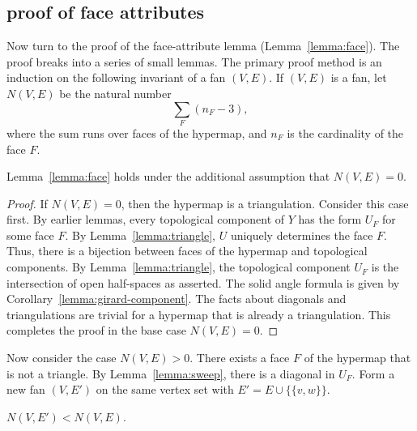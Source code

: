 \subsection{proof of face attributes}

Now turn to the proof of the face-attribute lemma (Lemma~\ref{lemma:face}).  The proof breaks into a series of small lemmas.  The primary proof method is an induction on the following invariant of a fan $(V,E)$.  If $(V,E)$ is a fan,  let $N(V,E)$ be the natural number
$$
\sum_F (n_F - 3),
$$
where the sum runs over faces of the  hypermap, and $n_F$ is the cardinality of the face $F$.

\begin{lemma} Lemma~\ref{lemma:face} holds under the additional assumption that $N(V,E) = 0$.
\end{lemma}

\begin{proof}
If $N(V,E)=0$, then the hypermap is a triangulation.  Consider this
case first.  By earlier lemmas, every topological component of $Y$ has
the form $U_F$ for some face $F$.  By Lemma~\ref{lemma:triangle}, $U$ uniquely determines the face $F$.  Thus, there is a bijection between faces of the hypermap and topological components.  By Lemma~\ref{lemma:triangle}, the topological component $U_F$ is the intersection of open half-spaces as asserted.  The solid angle formula is given by Corollary~\ref{lemma:girard-component}.  The facts about diagonals and triangulations are trivial for a hypermap that is already a triangulation. This completes the proof in the base case $N(V,E)=0$.
\end{proof}

Now consider the case $N(V,E)>0$.  There exists a face $F$ of the hypermap that is not a triangle.  By Lemma~\ref{lemma:sweep}, there is a diagonal in $U_F$. Form a new fan $(V,E')$ on the same vertex set with
$E' = E\cup \{\{v,w\}\}$.   

\begin{lemma} 
$N(V,E')<N(V,E)$.
\end{lemma}


